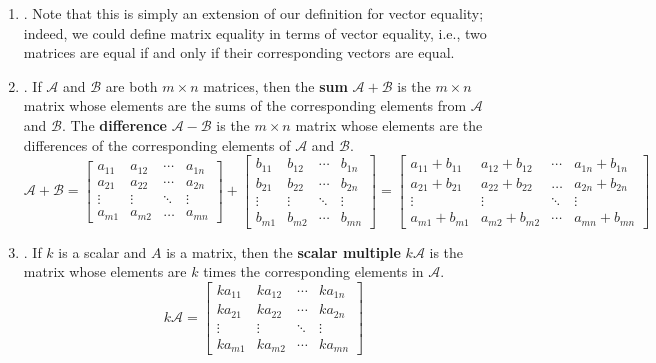 \documentclass[12pt]{article}
\begin{document}
\begin{enumerate}
\begin{enumerate}
	\item\underline{}.
		Note that this is simply an extension of our definition for vector equality; indeed, we could define matrix equality in
		terms of vector equality, i.e., two matrices are equal if and only if their corresponding vectors are equal.

	\item\underline{}.
		If $\mathcal{A}$ and $\mathcal{B}$ are both $m\times n$ matrices, then the \textbf{sum} $\mathcal{A}+\mathcal{B}$ is the $m\times n$ matrix whose elements are the sums
		of the corresponding elements from $\mathcal{A}$ and $\mathcal{B}$. The \textbf{difference} $\mathcal{A}-\mathcal{B}$ is the $m\times n$ matrix whose elements are the differences of the corresponding elements of $\mathcal{A}$ and $\mathcal{B}$.
			\[\mathcal{A}+\mathcal{B} = \begin{bmatrix}    a_{11} 		&a_{12}		&\cdots 		&a_{1n}	\\
														a_{21} 		 &a_{22}		&\cdots 		&a_{2n}  \\
														\vdots		&\vdots	 	&\ddots	  &\vdots	\\ 
														a_{m1} 		&a_{m2} 	&\dots 	  &a_{mn}\end{bmatrix}
					+\begin{bmatrix}    b_{11} 		&b_{12}		&\cdots 		&b_{1n}	\\
													b_{21} 		&b_{22}		&\cdots 		&b_{2n}  \\
													\vdots		&\vdots	 	&\ddots	  &\vdots	\\ 
													b_{m1} 		&b_{m2} 	&\cdots 	  &b_{mn}\end{bmatrix}
					=\begin{bmatrix}    a_{11}+b_{11} 			&a_{12}+b_{12}		&\cdots 	  &a_{1n}+b_{1n}	\\
													a_{21}+b_{21} 			&a_{22}+b_{22}	&\dots 		&a_{2n}+b_{2n}  \\
													\vdots						&\vdots	 				&\ddots	  &\vdots	\\ 
													a_{m1}+b_{m1} 		&a_{m2}+b_{m2}	&\cdots 	  &a_{mn}+b_{mn} \end{bmatrix}\]

	\item\underline{}.
		If $k$ is a scalar and $A$ is a matrix, then the \textbf{scalar multiple} $k\mathcal{A}$ is the matrix whose elements are $k$ times the corresponding elements in $\mathcal{A}$.
				\[k\mathcal{A}=\begin{bmatrix}
						ka_{11} 	 & ka_{12} 	 & \cdots  	& ka_{1n}\\
						ka_{21} 	& ka_{22} 	& \cdots    & ka_{2n}\\
						\vdots 		& \vdots 	 & \ddots  & \vdots  \\ 
						ka_{m1}    & ka_{m2}  & \cdots    & ka_{mn}
				\end{bmatrix}\]
	

\end{enumerate}
\end{enumerate}
\end{document}

